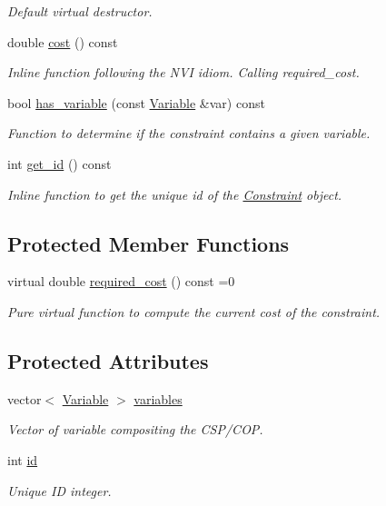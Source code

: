 \begin{DoxyCompactItemize}
\begin{DoxyCompactList}\small\item\em Default virtual destructor. \end{DoxyCompactList}\item 
double \hyperlink{classghost_1_1Constraint_adfa4826bcaea9e4a692fb0c4630ca214}{cost} () const 
\begin{DoxyCompactList}\small\item\em Inline function following the N\+VI idiom. Calling required\+\_\+cost. \end{DoxyCompactList}\item 
bool \hyperlink{classghost_1_1Constraint_a38945fa5e732b91d51c0eedfec9a99e3}{has\+\_\+variable} (const \hyperlink{classghost_1_1Variable}{Variable} \&var) const 
\begin{DoxyCompactList}\small\item\em Function to determine if the constraint contains a given variable. \end{DoxyCompactList}\item 
int \hyperlink{classghost_1_1Constraint_af483429a319284503ff634105cadbe08}{get\+\_\+id} () const 
\begin{DoxyCompactList}\small\item\em Inline function to get the unique id of the \hyperlink{classghost_1_1Constraint}{Constraint} object. \end{DoxyCompactList}\end{DoxyCompactItemize}
\subsection*{Protected Member Functions}
\begin{DoxyCompactItemize}
\item 
virtual double \hyperlink{classghost_1_1Constraint_a6ef4cd03a4dc864a8d308e55044c615d}{required\+\_\+cost} () const =0
\begin{DoxyCompactList}\small\item\em Pure virtual function to compute the current cost of the constraint. \end{DoxyCompactList}\end{DoxyCompactItemize}
\subsection*{Protected Attributes}
\begin{DoxyCompactItemize}
\item 
vector$<$ \hyperlink{classghost_1_1Variable}{Variable} $>$ \hyperlink{classghost_1_1Constraint_aabd62a463f0004e9e79227d380cf0020}{variables}
\begin{DoxyCompactList}\small\item\em Vector of variable compositing the C\+S\+P/\+C\+OP. \end{DoxyCompactList}\item 
int \hyperlink{classghost_1_1Constraint_a5215df3cd5269adb4c5f6168191b9d47}{id}
\begin{DoxyCompactList}\small\item\em Unique ID integer. \end{DoxyCompactList}\end{DoxyCompactItemize}
